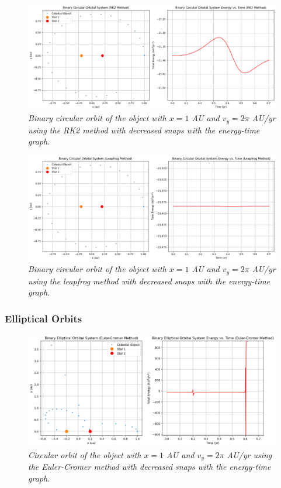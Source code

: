 \documentclass[11 pt, a4paper]{article}
\begin{document}
\begin{figure}[H]
  \includegraphics[width=0.7\linewidth]{binaryrk2circular.png}
  \centering
  \caption{\textit{Binary circular orbit of the object with $x = 1$ AU and $v_y = 2\pi$ AU/yr using the RK2 method with decreased snaps with the energy-time graph.}} 
\end{figure}

\begin{figure}[H]
  \includegraphics[width=0.7\linewidth]{binaryleapfrogcircular.png}
  \centering
  \caption{\textit{Binary circular orbit of the object with $x = 1$ AU and $v_y = 2\pi$ AU/yr using the leapfrog method with decreased snaps with the energy-time graph.}} 
\end{figure}

\subsubsection{Elliptical Orbits}
\begin{figure}[H]
  \includegraphics[width=0.7\linewidth]{binaryeulerelliptic.png}
  \centering
  \caption{\textit{Circular orbit of the object with $x = 1$ AU and $v_y = 2\pi$ AU/yr using the Euler-Cromer method with decreased snaps with the energy-time graph.}} 
\end{figure}
\end{document}
